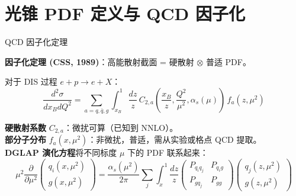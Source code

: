 \documentclass[10pt,aspectratio=169]{beamer}
\newcommand{\alphas}{\alpha_s}
\begin{document}
\section{光锥 PDF 定义与 QCD 因子化}

\begin{frame}{QCD 因子化定理}
{\small
\textbf{因子化定理 (CSS, 1989)}：高能散射截面 = 硬散射 $\otimes$ 普适 PDF。

对于 DIS 过程 $e + p \to e + X$：
\begin{equation*}
  \frac{d^2\sigma}{dx_B dQ^2} = \sum_{a=q,\bar{q},g}
  \int_{x_B}^1 \frac{dz}{z}\,
  C_{2,a}\!\left(\frac{x_B}{z}, \frac{Q^2}{\mu^2}, \alphas(\mu)\right)\,
  f_a(z, \mu^2)
\end{equation*}

\textbf{硬散射系数} $C_{2,a}$：微扰可算（已知到 NNLO）。\\
\textbf{部分子分布} $f_a(x,\mu^2)$：非微扰，普适，需从实验或格点 QCD 提取。\\
\textbf{DGLAP 演化方程}将不同标度 $\mu$ 下的 PDF 联系起来：
\begin{equation*}
  \mu^2\frac{\partial}{\partial\mu^2}
  \begin{pmatrix} q_i(x,\mu^2) \\ g(x,\mu^2) \end{pmatrix}
  = \frac{\alphas(\mu^2)}{2\pi} \sum_j \int_x^1 \frac{dz}{z}
  \begin{pmatrix} P_{q_i q_j} & P_{q_i g} \\ P_{g q_j} & P_{gg} \end{pmatrix}
  \begin{pmatrix} q_j(z,\mu^2) \\ g(z,\mu^2) \end{pmatrix}
\end{equation*}
}
\end{frame}
\end{document}
